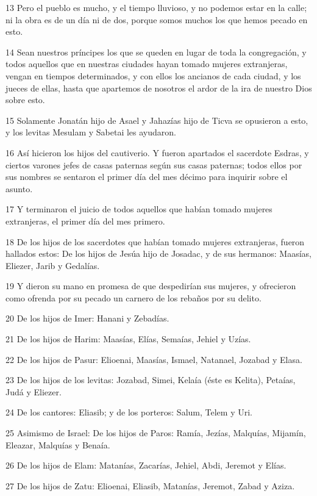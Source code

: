 \par 13 Pero el pueblo es mucho, y el tiempo lluvioso, y no podemos estar en la calle; ni la obra es de un día ni de dos, porque somos muchos los que hemos pecado en esto.
\par 14 Sean nuestros príncipes los que se queden en lugar de toda la congregación, y todos aquellos que en nuestras ciudades hayan tomado mujeres extranjeras, vengan en tiempos determinados, y con ellos los ancianos de cada ciudad, y los jueces de ellas, hasta que apartemos de nosotros el ardor de la ira de nuestro Dios sobre esto.
\par 15 Solamente Jonatán hijo de Asael y Jahazías hijo de Ticva se opusieron a esto, y los levitas Mesulam y Sabetai les ayudaron.
\par 16 Así hicieron los hijos del cautiverio. Y fueron apartados el sacerdote Esdras, y ciertos varones jefes de casas paternas según sus casas paternas; todos ellos por sus nombres se sentaron el primer día del mes décimo para inquirir sobre el asunto.
\par 17 Y terminaron el juicio de todos aquellos que habían tomado mujeres extranjeras, el primer día del mes primero.
\par 18 De los hijos de los sacerdotes que habían tomado mujeres extranjeras, fueron hallados estos: De los hijos de Jesúa hijo de Josadac, y de sus hermanos: Maasías, Eliezer, Jarib y Gedalías.
\par 19 Y dieron su mano en promesa de que despedirían sus mujeres, y ofrecieron como ofrenda por su pecado un carnero de los rebaños por su delito.
\par 20 De los hijos de Imer: Hanani y Zebadías.
\par 21 De los hijos de Harim: Maasías, Elías, Semaías, Jehiel y Uzías.
\par 22 De los hijos de Pasur: Elioenai, Maasías, Ismael, Natanael, Jozabad y Elasa.
\par 23 De los hijos de los levitas: Jozabad, Simei, Kelaía (éste es Kelita), Petaías, Judá y Eliezer.
\par 24 De los cantores: Eliasib; y de los porteros: Salum, Telem y Uri.
\par 25 Asimismo de Israel: De los hijos de Paros: Ramía, Jezías, Malquías, Mijamín, Eleazar, Malquías y Benaía.
\par 26 De los hijos de Elam: Matanías, Zacarías, Jehiel, Abdi, Jeremot y Elías.
\par 27 De los hijos de Zatu: Elioenai, Eliasib, Matanías, Jeremot, Zabad y Aziza.

